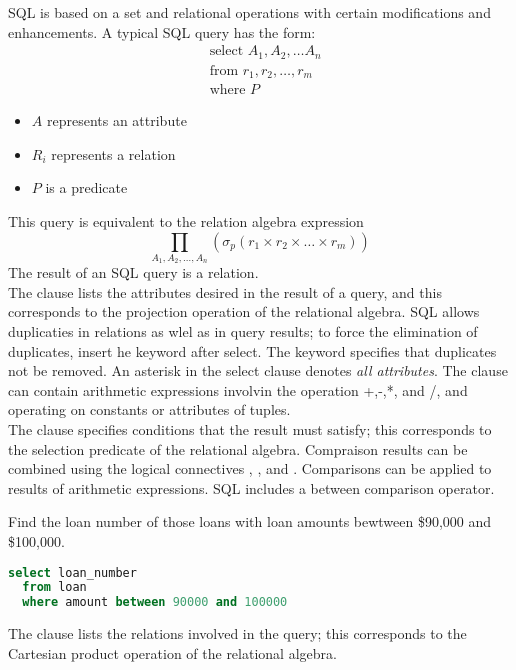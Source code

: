 \documentclass{article}
\begin{document}
SQL is based on a set and relational operations with certain modifications and enhancements. A typical SQL query has the form: 
\begin{align*}
  &\textrm{select } A_1 , A_2 , \dots A_n \\ 
  &\textrm{from } r_1 , r_2 , \dots , r_m \\ 
  &\textrm{where } P 
\end{align*}
\begin{itemize}
  \item $A$ represents an attribute 
  \item $R_i$ represents a relation 
  \item $P$ is a predicate 
\end{itemize}
This query is equivalent to the relation algebra expression $$\prod_{A_1 , A_2 , \dots , A_n}(\sigma_p (r_1 \times r_2 \times \dots \times r_m))$$ The result of an SQL query is a relation. \\ 

The  clause lists the attributes desired in the result of a query, and this corresponds to the projection operation of the relational algebra. SQL allows duplicaties in relations as wlel as in query results; to force the elimination of duplicates, insert he keyword  after select. The keyword  specifies that duplicates not be removed. An asterisk in the select clause denotes \emph{all attributes}. The  clause can contain arithmetic expressions involvin the operation +,-,*, and /, and operating on constants or attributes of tuples. \\ 

The  clause specifies conditions that the result must satisfy; this corresponds to the selection predicate of the relational algebra. Compraison results can be combined using the logical connectives , , and . Comparisons can be applied to results of arithmetic expressions. SQL includes a between comparison operator. 
\begin{example} 
  Find the loan number of those loans with loan amounts bewtween \$90,000 and \$100,000. \\ 
  \begin{lstlisting}[language=SQL]
  select loan_number 
  from loan 
  where amount between 90000 and 100000
  \end{lstlisting}
\end{example}

The  clause lists the relations involved in the query; this corresponds to the Cartesian product operation of the relational algebra. \\ 
\end{document}

